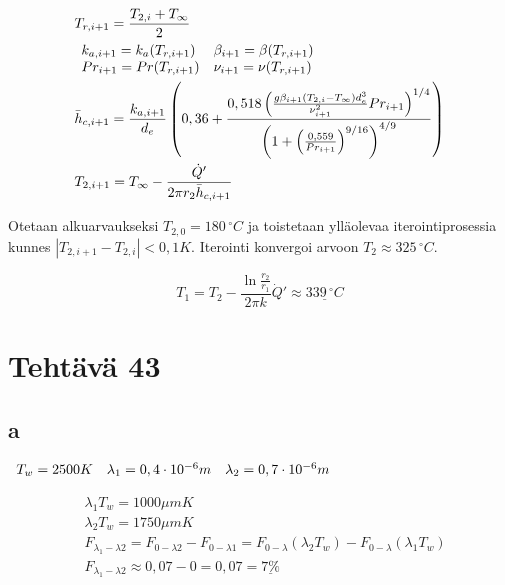 \documentclass[12pt,a4paper,finnish]{article}
\begin{document}
\begin{align}
 &T_{r,i + 1} = \frac{T_{2,i} + T_{\infty}}{2}\\
 &\begin{array}{l l l l}
  k_{a,i+1} = k_a(T_{r, i + 1}) & \beta_{i+1} = \beta(T_{r, i + 1}) \\
    Pr_{i+1} = Pr(T_{r, i + 1}) & \nu_{i+1} = \nu(T_{r, i + 1})
  \end{array}\\
 &\bar{h}_{c, i+1} = \frac{k_{a,i+1}}{d_e}\left(0,36 + 
  \frac{0,518\left(\frac{g\beta_{i+1}(T_{2, i} - T_{\infty})d_e^3}{\nu_{i+1}^2}Pr_{i+1}\right)^{1/4}}
    {\left(1 + \left(\frac{0,559}{Pr_{i+1}}\right)^{9/16}\right)^{4/9}}\right)\\
 &T_{2, i+1} =  T_{\infty} - \frac{\dot{Q}'}{2\pi r_2\bar{h}_{c, i+1}}
\end{align}

Otetaan alkuarvaukseksi $T_{2,0} = 180\,^{\circ}C$ ja toistetaan ylläolevaa iterointiprosessia kunnes
$|T_{2, i+1} - T_{2,i}| < 0,1 K$. Iterointi konvergoi arvoon $T_2 \approx 325\,^{\circ}C$.

\begin{equation}
  T_1 = T_2 - \frac{\ln \frac{r_2}{r_1}}{2\pi k}\dot{Q}' \approx \underline{339\,^{\circ}C}
\end{equation}

\newpage

\section{Tehtävä 43}

\subsection{a}

\begin{math}
 \begin{array}{l l l}
  T_w = 2500 K & \lambda_1 = 0,4\cdot10^{-6}m & \lambda_2 = 0,7\cdot10^{-6}m
 \end{array}
\end{math}

\begin{align}
 &\lambda_1 T_w = 1000 \mu mK\\
 &\lambda_2 T_w = 1750 \mu mK\\
 &F_{\lambda_1-\lambda 2} =  F_{0-\lambda 2} - F_{0-\lambda 1}
  =  F_{0-\lambda}(\lambda_2 T_w) - F_{0-\lambda}(\lambda_1 T_w)\\
 &F_{\lambda_1-\lambda 2} \approx 0,07 - 0 = 0,07 = \underline{7\%}
\end{align}
\end{document}
